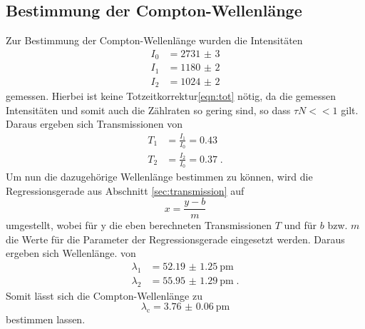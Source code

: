 \subsection{Bestimmung der Compton-Wellenlänge}
Zur Bestimmung der Compton-Wellenlänge wurden die Intensitäten 
\begin{align*}
    I_0 &= \num{2731(3)}\\
    I_1 &= \num{1180(2)}\\
    I_2 &= \num{1024(2)}
\end{align*}
gemessen. 
Hierbei ist keine Totzeitkorrektur\eqref{eqn:tot} nötig, da die gemessen Intensitäten und somit auch die Zählraten so gering sind,
so dass $\tau N << 1$ gilt.
Daraus ergeben sich Transmissionen von 
\begin{align*}
    T_1 &=\frac{I_1}{I_0} = 0.43 \\
    T_2 &=\frac{I_2}{I_0} = 0.37 \; \text{.}
\end{align*}
Um nun die dazugehörige Wellenlänge bestimmen zu können, wird die Regressionsgerade aus Abschnitt \ref{sec:transmission}
auf
\begin{equation*}
    x = \frac{y-b}{m}
\end{equation*}
umgestellt, wobei für y die eben berechneten Transmissionen $T$ und für $b$ bzw. $m$ die Werte für die Parameter der Regressionsgerade eingesetzt werden.
Daraus ergeben sich Wellenlänge. von 
\begin{align*}
    \lambda_1 &= \SI{52.19(125)}{\pico\metre} \\
    \lambda_2 &= \SI{55.95(129)}{\pico\metre} \; \text{.}
\end{align*}
Somit lässt sich die Compton-Wellenlänge zu 
\begin{equation*}
    \lambda_\text{c} = \SI{3.76(6)}{\pico\metre}
\end{equation*}
bestimmen lassen.